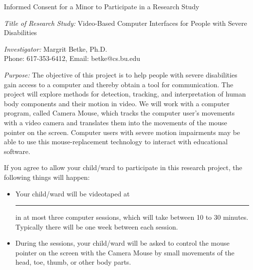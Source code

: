 
\setlength{\textheight}{9.75in}
\setlength{\footheight}{0.0in}
\setlength{\topmargin}{-0.25in}   %
\setlength{\headheight}{0.0in}
\setlength{\headsep}{0.0in}
\setlength{\textwidth}{6.6in}
\setlength{\oddsidemargin}{0in}
\setlength{\parindent}{0pc}
\setlength{\parskip}{6pt plus 1.5pt minus 1.5pt}


\signature{\vspace*{-.7cm} Margrit Betke,\\ Associate Professor}


\pagestyle{empty}

\begin{letter}

\centerline{\Large Informed Consent for a Minor to
Participate in a Research Study }

\vspace*{.5cm}
{\em Title of Research Study:} Video-Based Computer Interfaces for People
with Severe Disabilities

{\em Investigator:} Margrit Betke, Ph.D.\\
Phone: 617-353-6412, Email: betke@cs.bu.edu

{\em Purpose:} The objective of this project is to help people with
severe disabilities gain access to a computer and thereby obtain a
tool for communication.  The project will explore methods for
detection, tracking, and interpretation of human body components and
their motion in video.  We will work with a computer program, called
Camera Mouse, which tracks the computer user's movements with a video
camera and translates them into the movements of the mouse pointer on
the screen.  Computer users with severe motion impairments may be able
to use this mouse-replacement technology to interact with educational
software.

If you agree to allow your child/ward to participate in this research
project, the following things will happen:

\begin{itemize}
\item Your child/ward will be videotaped at \rule{3cm}{.01cm} in at
 most three computer sessions, which will take between 10 to 30
 minutes.  Typically there will be one week between each session.

\item During the sessions, your child/ward will be asked to control
the mouse pointer on the screen with the Camera Mouse by small
movements of the head, toe, thumb, or other body parts.


\end{itemize}
\end{letter}
